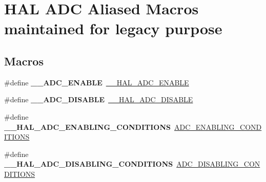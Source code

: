 \hypertarget{group___h_a_l___a_d_c___aliased___macros}{}\section{H\+AL A\+DC Aliased Macros maintained for legacy purpose}
\label{group___h_a_l___a_d_c___aliased___macros}
\subsection*{Macros}
\begin{DoxyCompactItemize}
\item 
\mbox{\label{group___h_a_l___a_d_c___aliased___macros_gade2e452da8695130dbc0b8b516ec16ff}} 
\#define {\bfseries \+\_\+\+\_\+\+A\+D\+C\+\_\+\+E\+N\+A\+B\+LE}~\hyperlink{group___a_d_c___exported___macros_gaadf16862da7593def189559423c287f4}{\+\_\+\+\_\+\+H\+A\+L\+\_\+\+A\+D\+C\+\_\+\+E\+N\+A\+B\+LE}
\item 
\mbox{\label{group___h_a_l___a_d_c___aliased___macros_ga6a8dfa9e047c1ac8f70d2fe3ae3fd4dc}} 
\#define {\bfseries \+\_\+\+\_\+\+A\+D\+C\+\_\+\+D\+I\+S\+A\+B\+LE}~\hyperlink{group___a_d_c___exported___macros_ga8afd5963c41c0a30c5cf1fec5c5710b3}{\+\_\+\+\_\+\+H\+A\+L\+\_\+\+A\+D\+C\+\_\+\+D\+I\+S\+A\+B\+LE}
\item 
\mbox{\label{group___h_a_l___a_d_c___aliased___macros_gaf09405aa65148ec822984b2d81992596}} 
\#define {\bfseries \+\_\+\+\_\+\+H\+A\+L\+\_\+\+A\+D\+C\+\_\+\+E\+N\+A\+B\+L\+I\+N\+G\+\_\+\+C\+O\+N\+D\+I\+T\+I\+O\+NS}~\hyperlink{group___a_d_c___private___macros_ga659ecd034552504fc163da87bad15ddc}{A\+D\+C\+\_\+\+E\+N\+A\+B\+L\+I\+N\+G\+\_\+\+C\+O\+N\+D\+I\+T\+I\+O\+NS}
\item 
\mbox{\label{group___h_a_l___a_d_c___aliased___macros_ga758e02a9d4e37528e42ff60eff476cbf}} 
\#define {\bfseries \+\_\+\+\_\+\+H\+A\+L\+\_\+\+A\+D\+C\+\_\+\+D\+I\+S\+A\+B\+L\+I\+N\+G\+\_\+\+C\+O\+N\+D\+I\+T\+I\+O\+NS}~\hyperlink{group___a_d_c___private___macros_ga52dac43dfd7bb8d95df16b30d7567c3f}{A\+D\+C\+\_\+\+D\+I\+S\+A\+B\+L\+I\+N\+G\+\_\+\+C\+O\+N\+D\+I\+T\+I\+O\+NS}
\item 

\end{DoxyCompactItemize}
